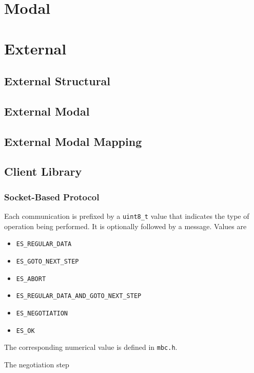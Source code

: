 \section{Modal}

\section{External}

\subsection{External Structural}

\subsection{External Modal}

\subsection{External Modal Mapping}

\subsection{Client Library}

\subsubsection{Socket-Based Protocol}
Each communication is prefixed by a \texttt{uint8\_t} value
that indicates the type of operation being performed.
It is optionally followed by a message.
Values are
\begin{itemize}
\item \texttt{ES\_REGULAR\_DATA}
\item \texttt{ES\_GOTO\_NEXT\_STEP}
\item \texttt{ES\_ABORT}
\item \texttt{ES\_REGULAR\_DATA\_AND\_GOTO\_NEXT\_STEP}
\item \texttt{ES\_NEGOTIATION}
\item \texttt{ES\_OK}
\end{itemize}
The corresponding numerical value is defined in \texttt{mbc.h}.

The negotiation step
